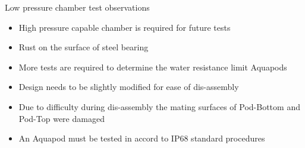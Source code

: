 Low pressure chamber test observations
\begin{itemize}
    \item High pressure capable chamber is required for future tests
    
    \item Rust on the surface of steel bearing 
    
    \item More tests are required to determine the water resistance limit Aquapods

    \item Design needs to be slightly modified for ease of dis-assembly

    \item Due to difficulty during dis-assembly the mating surfaces of Pod-Bottom and Pod-Top were damaged
    
    \item An Aquapod must be tested in accord to IP68 standard procedures 
    
\end{itemize}

